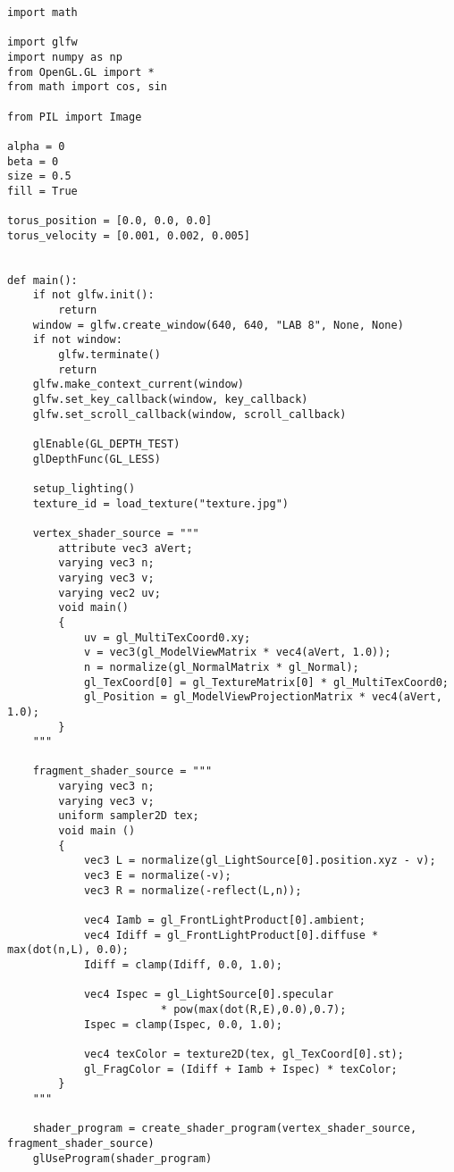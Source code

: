 \documentclass[a4paper, 14pt]{extarticle}
\begin{document}
\begin{lstlisting}
import math

import glfw
import numpy as np
from OpenGL.GL import *
from math import cos, sin

from PIL import Image

alpha = 0
beta = 0
size = 0.5
fill = True

torus_position = [0.0, 0.0, 0.0]
torus_velocity = [0.001, 0.002, 0.005]


def main():
    if not glfw.init():
        return
    window = glfw.create_window(640, 640, "LAB 8", None, None)
    if not window:
        glfw.terminate()
        return
    glfw.make_context_current(window)
    glfw.set_key_callback(window, key_callback)
    glfw.set_scroll_callback(window, scroll_callback)

    glEnable(GL_DEPTH_TEST)
    glDepthFunc(GL_LESS)

    setup_lighting()
    texture_id = load_texture("texture.jpg")

    vertex_shader_source = """
        attribute vec3 aVert;
        varying vec3 n;
        varying vec3 v;
        varying vec2 uv;
        void main()
        {
            uv = gl_MultiTexCoord0.xy;
            v = vec3(gl_ModelViewMatrix * vec4(aVert, 1.0));
            n = normalize(gl_NormalMatrix * gl_Normal);
            gl_TexCoord[0] = gl_TextureMatrix[0] * gl_MultiTexCoord0;
            gl_Position = gl_ModelViewProjectionMatrix * vec4(aVert, 1.0);
        }
    """

    fragment_shader_source = """
        varying vec3 n;
        varying vec3 v;
        uniform sampler2D tex;
        void main ()
        {
            vec3 L = normalize(gl_LightSource[0].position.xyz - v);
            vec3 E = normalize(-v);
            vec3 R = normalize(-reflect(L,n));

            vec4 Iamb = gl_FrontLightProduct[0].ambient;
            vec4 Idiff = gl_FrontLightProduct[0].diffuse * max(dot(n,L), 0.0);
            Idiff = clamp(Idiff, 0.0, 1.0);

            vec4 Ispec = gl_LightSource[0].specular
                        * pow(max(dot(R,E),0.0),0.7);
            Ispec = clamp(Ispec, 0.0, 1.0);

            vec4 texColor = texture2D(tex, gl_TexCoord[0].st);
            gl_FragColor = (Idiff + Iamb + Ispec) * texColor;
        }
    """

    shader_program = create_shader_program(vertex_shader_source, fragment_shader_source)
    glUseProgram(shader_program)


\end{lstlisting}
\end{document}
